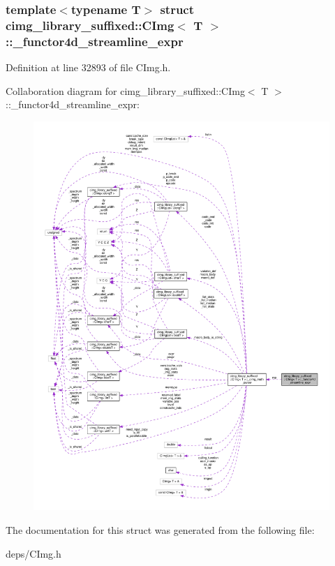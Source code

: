 \subsubsection*{template$<$typename T$>$\newline
struct cimg\+\_\+library\+\_\+suffixed\+::\+C\+Img$<$ T $>$\+::\+\_\+functor4d\+\_\+streamline\+\_\+expr}



Definition at line 32893 of file C\+Img.\+h.



Collaboration diagram for cimg\+\_\+library\+\_\+suffixed\+:\+:C\+Img$<$ T $>$\+:\+:\+\_\+functor4d\+\_\+streamline\+\_\+expr\+:
\nopagebreak
\begin{figure}[H]
\begin{center}
\leavevmode
\includegraphics[width=350pt]{db/d7e/structcimg__library__suffixed_1_1CImg_1_1__functor4d__streamline__expr__coll__graph}
\end{center}
\end{figure}


The documentation for this struct was generated from the following file\+:\begin{DoxyCompactItemize}
\item 
deps/C\+Img.\+h\end{DoxyCompactItemize}
